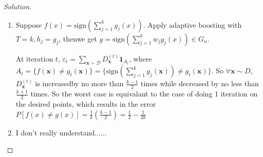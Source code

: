 \documentclass[12pt,letterpaper]{article}
\newenvironment{solution}{%
  \begin{proof}[Solution]$ $\par\nobreak\ignorespaces
}{%
  \end{proof}
}
\def \x{\boldsymbol{x}}
\begin{document}
\begin{solution}
\begin{enumerate}[label=(\alph*)]
\item Suppose $f(x)=\mathrm{sign}(\sum_{j=1}^{k}g_{j}(x))$. Apply adaptive boosting with $T=k, h_{j}=g_{j}$, thenwe get $g=\mathrm{sign}(\sum_{j=1}^{k}w_{j}g_{j}(x))\in G_{n}$.

  At iteration $t$, $\varepsilon_{t}=\sum_{\x\sim\mathcal{D}}D^{(t)}_{\x}\bm{1}_{A_{t}}$, where $A_{t}=\{f(\x)\neq g_{t}(\x)\}=\{\mathrm{sign}(\sum_{j=1}^{k}g_{j}(\x))\neq g_{t}(\x)\}$. So $\forall\x\sim D$, $D_{\x}^{(t)}$ is increasedby no more than $\frac{k-1}{2}$ times while decreased by no less than $\frac{k+1}{2}$ times. So the worst case is equivalant to the case of doing 1 iteration on the desired points, which results in the error $P[f(x)\neq g(x)]=\frac{1}{k}(\frac{k-1}{2})=\frac{1}{2}-\frac{1}{2k}$
\item
   I don't really understand......
  
\end{enumerate}
\end{solution}
\end{document}
